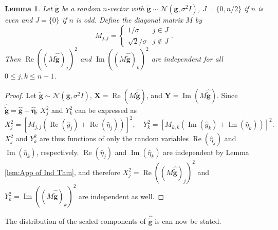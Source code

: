 \documentclass[12pt]{book}
\newcommand{\gVec}{\mathbf{g}}	%
\newcommand{\gnoiseVec}{\widetilde{\mathbf{g}}}	%
\newcommand{\noise}{\eta}	%
\newcommand{\noiseSD}{\sigma}	%
\newcommand{\noiseVec}{\bm{\noise}}	%
\renewcommand{\Re}{\operatorname{Re}}	%
\renewcommand{\Im}{\operatorname{Im}}	%
\newtheorem{lemma}{Lemma}[section]
\begin{document}
\begin{lemma}
\label{lem:App of Ind Thm 2}
Let $\gnoiseVec$ be a random $n$-vector with $\gnoiseVec \sim \mathcal{N}(\gVec,\noiseSD^2 I)$, $J = \{0,n/2\}$ if $n$ is even and $J = \{0\}$ if $n$ is odd. Define the diagonal matrix $M$ by
\[M_{j,j} = \begin{cases}
1/\noiseSD & j \in J \\
\sqrt{2}/\noiseSD & j \not\in J
\end{cases}.\]
Then $\Re((M\widehat{\gnoiseVec})_j)^2$ and $\Im((M\widehat{\gnoiseVec})_k)^2$ are independent for all $0 \leq j,k \leq n-1$.
\end{lemma}
\begin{proof}
Let $\gnoiseVec \sim \mathcal{N}(\gVec,\noiseSD^2 I)$, $\mathbf{X} = \Re(M\widehat{\gnoiseVec})$, and $\mathbf{Y} = \Im(M\widehat{\gnoiseVec})$. Since $\widehat{\gnoiseVec} = \widehat{\gVec} + \widehat{\noiseVec}$, $X_j^2$ and $Y_k^2$ can be expressed as 
\[X_j^2 = [M_{j,j}(\Re(\widehat{g}_j) + \Re(\widehat{\noise}_j))]^2, \quad Y_k^2 = [M_{k,k}(\Im(\widehat{g}_k) + \Im(\widehat{\noise}_k))]^2.\]
$X_j^2$ and $Y_k^2$ are thus functions of only the random variables $\Re(\widehat{\noise}_j)$ and $\Im(\widehat{\noise}_k)$, respectively. $\Re(\widehat{\noise}_j)$ and $\Im(\widehat{\noise}_k)$ are independent by Lemma \ref{lem:App of Ind Thm}, and therefore $X_j^2 = \Re((M\widehat{\gnoiseVec})_j)^2$ and $Y_k^2 = \Im((M\widehat{\gnoiseVec})_k)^2$ are independent as well.
\end{proof}

The distribution of the scaled components of $\widehat{\gnoiseVec}$ is can now be stated. 
\end{document}
